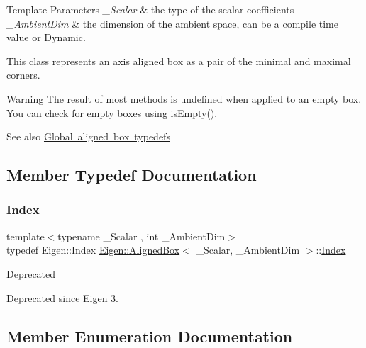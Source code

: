 \begin{DoxyTemplParams}{Template Parameters}
{\em \+\_\+\+Scalar} & the type of the scalar coefficients \\
\hline
{\em \+\_\+\+Ambient\+Dim} & the dimension of the ambient space, can be a compile time value or Dynamic.\\
\hline
\end{DoxyTemplParams}
This class represents an axis aligned box as a pair of the minimal and maximal corners. \begin{DoxyWarning}{Warning}
The result of most methods is undefined when applied to an empty box. You can check for empty boxes using \mbox{\hyperlink{class_eigen_1_1_aligned_box_a0d194e2e56c3bef854e88ca2aba04c9e}{is\+Empty()}}. 
\end{DoxyWarning}
\begin{DoxySeeAlso}{See also}
\mbox{\hyperlink{group__alignedboxtypedefs}{Global aligned box typedefs}} 
\end{DoxySeeAlso}


\subsection{Member Typedef Documentation}
\mbox{\label{class_eigen_1_1_aligned_box_a774ef355da13d6bee6a6e7244c15231a}} 
\subsubsection{\texorpdfstring{Index}{Index}}
{\footnotesize\ttfamily template$<$typename \+\_\+\+Scalar , int \+\_\+\+Ambient\+Dim$>$ \\
typedef Eigen\+::\+Index \mbox{\hyperlink{class_eigen_1_1_aligned_box}{Eigen\+::\+Aligned\+Box}}$<$ \+\_\+\+Scalar, \+\_\+\+Ambient\+Dim $>$\+::\mbox{\hyperlink{class_eigen_1_1_aligned_box_a774ef355da13d6bee6a6e7244c15231a}{Index}}}

\begin{DoxyRefDesc}{Deprecated}
\item[\mbox{\hyperlink{deprecated__deprecated000025}{Deprecated}}]since Eigen 3. \end{DoxyRefDesc}


\subsection{Member Enumeration Documentation}
\mbox{\label{class_eigen_1_1_aligned_box_ae4aa935b36004fffc49c7a3a85e2d378}} 
